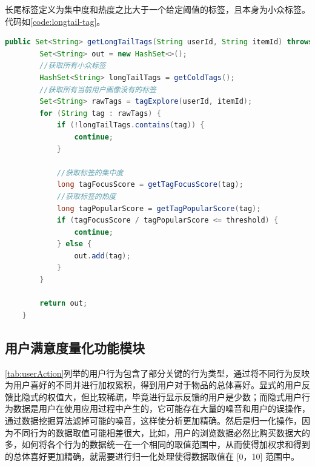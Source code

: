   长尾标签定义为集中度和热度之比大于一个给定阈值的标签，且本身为小众标签。代码如\autoref{code:longtail-tag}。
  \begin{lstlisting}[language=java,firstnumber=1,label={code:longtail-tag}, caption={长尾标签抽取算法}]
    public Set<String> getLongTailTags(String userId, String itemId) throws Exception {
        Set<String> out = new HashSet<>();
        //获取所有小众标签
        HashSet<String> longTailTags = getColdTags();
        //获取所有当前用户画像没有的标签
        Set<String> rawTags = tagExplore(userId, itemId);
        for (String tag : rawTags) {
            if (!longTailTags.contains(tag)) {
                continue;
            }

            //获取标签的集中度
            long tagFocusScore = getTagFocusScore(tag);
            //获取标签的热度
            long tagPopularScore = getTagPopularScore(tag);
            if (tagFocusScore / tagPopularScore <= threshold) {
                continue;
            } else {
                out.add(tag);
            }
        }

        return out;
    }
  \end{lstlisting}

  \subsection{用户满意度量化功能模块}
    \autoref{tab:userAction}列举的用户行为包含了部分关键的行为类型，通过将不同行为反映为用户喜好的不同并进行加权累积，得到用户对于物品的总体喜好。显式的用户反馈比隐式的权值大，但比较稀疏，毕竟进行显示反馈的用户是少数；而隐式用户行为数据是用户在使用应用过程中产生的，它可能存在大量的噪音和用户的误操作，通过数据挖掘算法滤掉可能的噪音，这样使分析更加精确。然后是归一化操作，因为不同行为的数据取值可能相差很大，比如，用户的浏览数据必然比购买数据大的多，如何将各个行为的数据统一在一个相同的取值范围中，从而使得加权求和得到的总体喜好更加精确，就需要进行归一化处理使得数据取值在 [0，10] 范围中。

